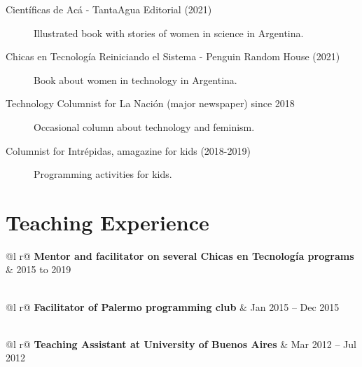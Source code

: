 \documentclass[a4paper,12pt]{article}
\begin{document}
\begin{description}
\item[Científicas de Acá - TantaAgua Editorial (2021)] Illustrated book with stories of women in science in Argentina.
\item[Chicas en Tecnología Reiniciando el Sistema - Penguin Random House (2021)] Book about women in technology in Argentina.
\item[Technology Columnist for La Nación (major newspaper) since 2018 ] Occasional column about technology and feminism.
\item[Columnist for  Intrépidas, amagazine for kids (2018-2019)] Programming activities for kids.


\end{description}

\section{Teaching Experience}

\begin{tabularx}{\linewidth}{ @{}l r@{} }
\textbf{Mentor and facilitator on several Chicas en Tecnología programs} & \hfill  2015 to 2019 \\[3.75pt]
  \\
\end{tabularx}


\begin{tabularx}{\linewidth}{ @{}l r@{} }
\textbf{Facilitator of Palermo programming club} & \hfill Jan 2015 – Dec 2015 \\[3.75pt]
  \\
\end{tabularx}

\begin{tabularx}{\linewidth}{ @{}l r@{} }
\textbf{Teaching Assistant at University of Buenos Aires} & \hfill Mar 2012 – Jul 2012 \\[3.75pt]
  \\
\end{tabularx}
\end{document}
